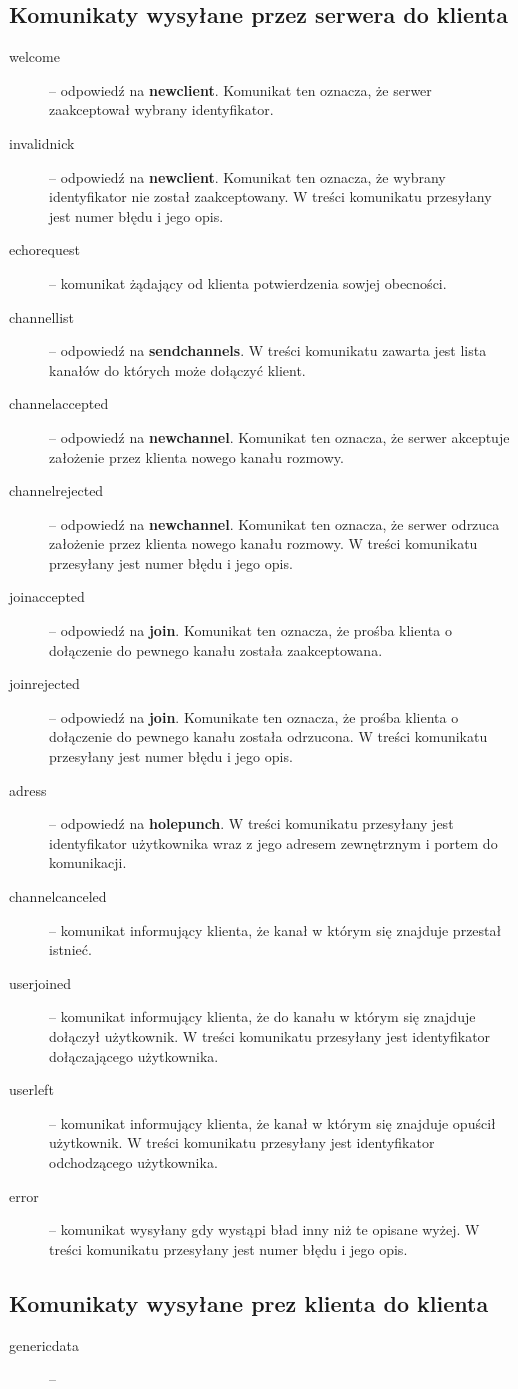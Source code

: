 \documentclass[a4paper, 10pt]{article}
\begin{document}
\subsection{Komunikaty wysyłane przez serwera do klienta}
\begin{description}
 \item[welcome] -- odpowiedź na \textbf{newclient}. Komunikat ten oznacza, że serwer zaakceptował wybrany identyfikator.
 \item[invalidnick] -- odpowiedź na \textbf{newclient}. Komunikat ten oznacza, że wybrany identyfikator nie został zaakceptowany. W treści komunikatu przesyłany jest numer błędu i jego opis.
 \item[echorequest] -- komunikat żądający od klienta potwierdzenia sowjej obecności.
 \item[channellist] -- odpowiedź na \textbf{sendchannels}. W treści komunikatu zawarta jest lista kanałów do których może dołączyć klient.
 \item[channelaccepted] -- odpowiedź na \textbf{newchannel}. Komunikat ten oznacza, że serwer akceptuje założenie przez klienta nowego kanału rozmowy.
  \item[channelrejected] -- odpowiedź na \textbf{newchannel}. Komunikat ten oznacza, że serwer odrzuca założenie przez klienta nowego kanału rozmowy. W treści komunikatu przesyłany jest numer błędu i jego opis.
 \item[joinaccepted] -- odpowiedź na \textbf{join}. Komunikat ten oznacza, że prośba klienta o dołączenie do pewnego kanału została zaakceptowana.
  \item[joinrejected] -- odpowiedź na \textbf{join}. Komunikate ten oznacza, że prośba klienta o dołączenie do pewnego kanału została odrzucona. W treści komunikatu przesyłany jest numer błędu i jego opis.
 \item[adress] -- odpowiedź na \textbf{holepunch}. W treści komunikatu przesyłany jest identyfikator użytkownika wraz z jego adresem zewnętrznym i portem do komunikacji.
 \item[channelcanceled] -- komunikat informujący klienta, że kanał w którym się znajduje przestał istnieć.
  \item[userjoined] -- komunikat informujący klienta, że do kanału w którym się znajduje dołączył użytkownik. W treści komunikatu przesyłany jest identyfikator dołączającego użytkownika.
 \item[userleft] -- komunikat informujący klienta, że kanał w którym się znajduje opuścił użytkownik. W treści komunikatu przesyłany jest identyfikator odchodzącego użytkownika.
 \item[error] -- komunikat wysyłany gdy wystąpi bład inny niż te opisane wyżej. W treści komunikatu przesyłany jest numer błędu i jego opis.
\end{description}

\subsection{Komunikaty wysyłane prez klienta do klienta}
\begin{description}
\item[genericdata]  -- 
\end{description}
\end{document}

